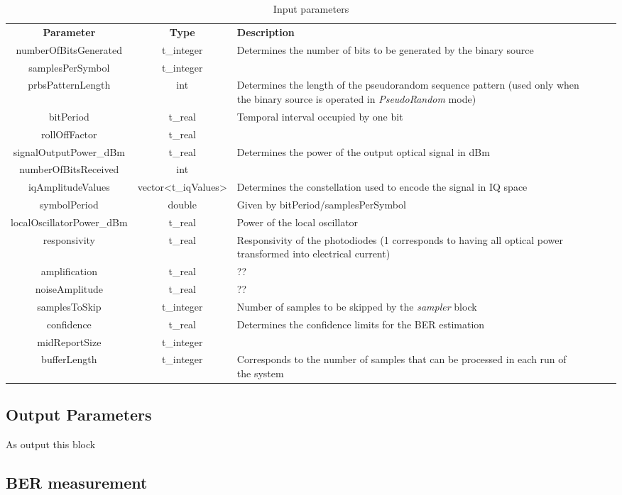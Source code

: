 \begin{table}[]
	\centering
	\caption{Input parameters}
	\begin{tabular}{|c|c|p{60mm}|ccp{60mm}}
		\cline{1-3}
		\textbf{Parameter} & \textbf{Type} & \textbf{Description} &    \\ \cline{1-3}
		numberOfBitsGenerated & t\_integer & Determines the number of bits to be generated by the binary source  &    \\ \cline{1-3}
		samplesPerSymbol & t\_integer &  &    \\ \cline{1-3}
		prbsPatternLength & int & Determines the length of the pseudorandom sequence pattern (used only when the binary source is operated in \textit{PseudoRandom} mode) &    \\ \cline{1-3}
		bitPeriod & t\_real & Temporal interval occupied by one bit &    \\ \cline{1-3}
		rollOffFactor & t\_real &  &    \\ \cline{1-3}
		signalOutputPower\_dBm & t\_real & Determines the power of the output optical signal in dBm &  \\ \cline{1-3}
		numberOfBitsReceived & int &      \\ \cline{1-3}
		iqAmplitudeValues & vector<t\_iqValues> & Determines the constellation used to encode the signal in IQ space &    \\ \cline{1-3}
		symbolPeriod & double & Given by bitPeriod/samplesPerSymbol &    \\ \cline{1-3}
		localOscillatorPower\_dBm & t\_real & Power of the local oscillator &    \\ \cline{1-3}
		responsivity & t\_real & Responsivity of the photodiodes (1 corresponds to having all optical power transformed into electrical current) &    \\ \cline{1-3}
		amplification & t\_real & ?? &    \\ \cline{1-3}
		noiseAmplitude & t\_real & ?? &    \\ \cline{1-3}
		samplesToSkip & t\_integer & Number of samples to be skipped by the \textit{sampler} block &    \\ \cline{1-3}
		confidence & t\_real & Determines the confidence limits for the BER estimation &    \\ \cline{1-3}
		midReportSize & t\_integer &  &    \\ \cline{1-3}
		bufferLength & t\_integer & Corresponds to the number of samples that can be processed in each run of the system &    \\ \cline{1-3}
		\end{tabular}
		\end{table}

\subsection{Output Parameters}

As output this block 

\subsection{BER measurement}


